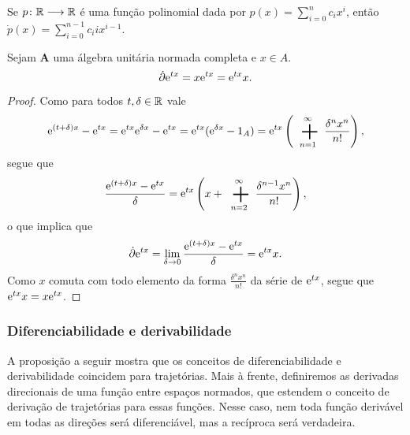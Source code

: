 \begin{exercise}
Se $p\colon \allowbreak \mathbb{R} \longrightarrow \mathbb{R}$ é uma função polinomial dada por $p(x) = \sum_{i=0}^n c_ix^i$, então $\dot{p}(x) = \sum_{i=0}^{n-1} c_i i x^{i-1}$.
\end{exercise}

\begin{proposition}
\label{prop:derivada.exponencial}
Sejam $\bm A$ uma álgebra unitária normada completa e $x \in A$.
	\begin{equation*}
	\dot{\partial} \mathrm{e}^{tx} = x \mathrm{e}^{tx} = \mathrm{e}^{tx} x.
	\end{equation*}
\end{proposition}
\begin{proof}
Como para todos $t,\delta \in \mathbb{R}$ vale
	\begin{equation*}
	\e^{(t+\delta)x} - \e^{tx} = \e^{tx} \e^{\delta x} - \e^{tx} = \e^{tx} (\e^{\delta x} - \id_A) = \e^{tx} \left( \sum_{n=1}^{\infty} \frac{\delta^n x^n}{n!} \right),
	\end{equation*}
segue que
	\begin{equation*}
	\frac{\e^{(t+\delta)x} - \e^{tx}}{\delta} = \e^{tx} \left(x + \sum_{n=2}^{\infty} \frac{\delta^{n-1} x^n}{n!} \right),
	\end{equation*}
o que implica que
	\begin{equation*}
	\dot{\partial} \mathrm{e}^{tx} = \lim_{\delta \to 0} \frac{\mathrm{e}^{(t+\delta)x} - \mathrm{e}^{tx}}{\delta} = \mathrm{e}^{tx} x.
	\end{equation*}
Como $x$ comuta com todo elemento da forma $\frac{\delta^n x^n}{n!}$ da série de $\mathrm{e}^{tx}$, segue que $\mathrm{e}^{tx} x = x \mathrm{e}^{tx}$.
\end{proof}


\subsubsection{Diferenciabilidade e derivabilidade}

A proposição a seguir mostra que os conceitos de diferenciabilidade e derivabilidade coincidem para trajetórias. Mais à frente, definiremos as derivadas direcionais de uma função entre espaços normados, que estendem o conceito de derivação de trajetórias para essas funções. Nesse caso, nem toda função derivável em todas as direções será diferenciável, mas a recíproca será verdadeira.

